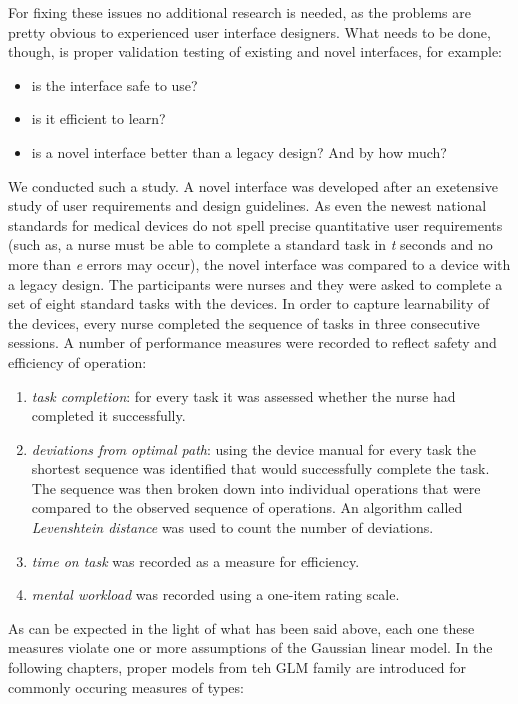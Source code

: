 \documentclass[]{svmono}
\providecommand{\tightlist}{%
  \setlength{\itemsep}{0pt}\setlength{\parskip}{0pt}}
\theoremstyle{definition}
\theoremstyle{definition}
\theoremstyle{definition}
\theoremstyle{remark}
\begin{document}
For fixing these issues no additional research is needed, as the
problems are pretty obvious to experienced user interface designers.
What needs to be done, though, is proper validation testing of existing
and novel interfaces, for example:

\begin{itemize}
\tightlist
\item
  is the interface safe to use?
\item
  is it efficient to learn?
\item
  is a novel interface better than a legacy design? And by how much?
\end{itemize}

We conducted such a study. A novel interface was developed after an
exetensive study of user requirements and design guidelines. As even the
newest national standards for medical devices do not spell precise
quantitative user requirements (such as, a nurse must be able to
complete a standard task in \emph{t} seconds and no more than \emph{e}
errors may occur), the novel interface was compared to a device with a
legacy design. The participants were nurses and they were asked to
complete a set of eight standard tasks with the devices. In order to
capture learnability of the devices, every nurse completed the sequence
of tasks in three consecutive sessions. A number of performance measures
were recorded to reflect safety and efficiency of operation:

\begin{enumerate}
\def\labelenumi{\arabic{enumi}.}
\tightlist
\item
  \emph{task completion}: for every task it was assessed whether the
  nurse had completed it successfully.
\item
  \emph{deviations from optimal path}: using the device manual for every
  task the shortest sequence was identified that would successfully
  complete the task. The sequence was then broken down into individual
  operations that were compared to the observed sequence of operations.
  An algorithm called \emph{Levenshtein distance} was used to count the
  number of deviations.
\item
  \emph{time on task} was recorded as a measure for efficiency.
\item
  \emph{mental workload} was recorded using a one-item rating scale.
\end{enumerate}

As can be expected in the light of what has been said above, each one
these measures violate one or more assumptions of the Gaussian linear
model. In the following chapters, proper models from teh GLM family are
introduced for commonly occuring measures of types:
\end{document}
